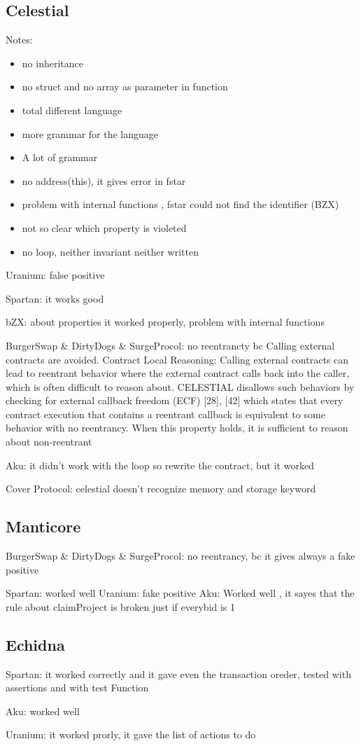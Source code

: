 \subsection{Celestial}
Notes:
\begin{itemize}
    \item no inheritance
    \item no struct and no array as parameter in function 
    \item total different language 
    \item more grammar for the language 
    \item A lot of grammar 
    \item no address(this), it gives error in fstar
    \item problem with internal functions , fstar could not find the identifier (BZX) 
    \item not so clear which property is violeted  
    \item no loop, neither invariant neither written
\end{itemize}

Uranium: false positive

Spartan: it works good 

bZX: about properties it worked properly, problem with internal functions 

BurgerSwap & DirtyDogs & SurgeProcol: no reentrancty bc Calling external contracts are avoided.
Contract Local Reasoning: Calling external contracts
can lead to reentrant behavior where the external contract
calls back into the caller, which is often difficult to reason
about. CELESTIAL disallows such behaviors by checking for
external callback freedom (ECF) [28], [42] which states that
every contract execution that contains a reentrant callback is
equivalent to some behavior with no reentrancy. When this
property holds, it is sufficient to reason about non-reentrant

Aku: it didn't work with the loop so rewrite the contract, but it worked 

Cover Protocol: celestial doesn't recognize memory and storage keyword

\subsection {Manticore}

BurgerSwap & DirtyDogs & SurgeProcol: no reentrancy, bc it gives always a fake positive

Spartan: worked well
Uranium: fake positive
Aku: Worked well , it sayes that the rule about claimProject is broken just if everybid is 1 

\subsection {Echidna}
Spartan: it worked correctly and it gave even the transaction oreder, tested with assertions and with test Function

Aku: worked well 

Uranium: it worked prorly, it gave the list of actions to do 

